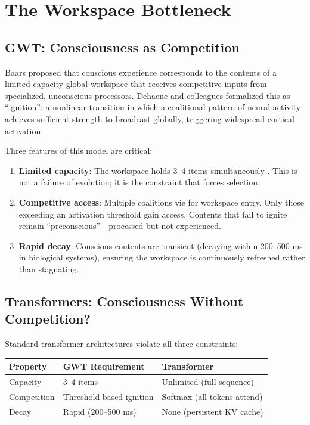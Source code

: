 \documentclass[10pt,letterpaper]{article}
\begin{document}
\section*{The Workspace Bottleneck}

\subsection*{GWT: Consciousness as Competition}

Baars \cite{baars1988} proposed that conscious experience corresponds
to the contents of a limited-capacity global workspace that receives
competitive inputs from specialized, unconscious processors. Dehaene
and colleagues \cite{dehaene2011, dehaene2014} formalized this as
``ignition'': a nonlinear transition in which a coalitional pattern of
neural activity achieves sufficient strength to broadcast globally,
triggering widespread cortical activation.

Three features of this model are critical:

\begin{enumerate}
\item \textbf{Limited capacity}: The workspace holds 3--4 items
simultaneously \cite{cowan2001}. This is not a failure of evolution;
it is the constraint that forces selection.

\item \textbf{Competitive access}: Multiple coalitions vie for workspace
entry. Only those exceeding an activation threshold gain access. Contents
that fail to ignite remain ``preconscious''---processed but not experienced.

\item \textbf{Rapid decay}: Conscious contents are transient (decaying
within 200--500 ms in biological systems), ensuring the workspace is
continuously refreshed rather than stagnating.
\end{enumerate}

\subsection*{Transformers: Consciousness Without Competition?}

Standard transformer architectures violate all three constraints:

\begin{center}
\begin{tabular}{lll}
\toprule
Property & GWT Requirement & Transformer \\
\midrule
Capacity & 3--4 items & Unlimited (full sequence) \\
Competition & Threshold-based ignition & Softmax (all tokens attend) \\
Decay & Rapid (200--500 ms) & None (persistent KV cache) \\
\bottomrule
\end{tabular}
\end{center}
\end{document}
